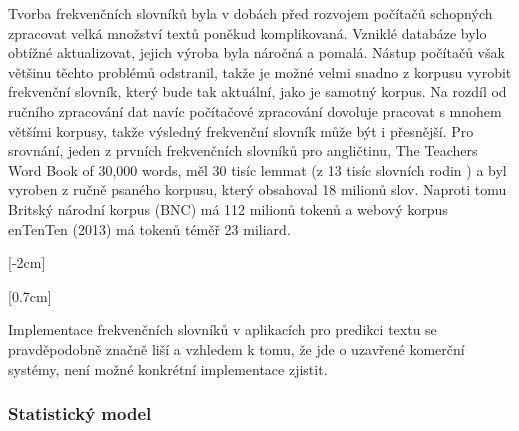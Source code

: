 \documentclass{article}
\begin{document}
Tvorba frekvenčních slovníků byla v dobách před rozvojem počítačů schopných zpracovat velká množství textů poněkud komplikovaná. Vzniklé databáze bylo obtížné aktualizovat, jejich výroba byla náročná a pomalá. Nástup počítačů však většinu těchto problémů odstranil, takže je možné velmi snadno z korpusu vyrobit frekvenční slovník, který bude tak aktuální, jako je samotný korpus. Na rozdíl od ručního zpracování dat navíc počítačové zpracování dovoluje pracovat s mnohem většími korpusy, takže výsledný frekvenční slovník může být i přesnější. Pro srovnání, jeden z prvních frekvenčních slovníků pro angličtinu, The Teachers Word Book of 30,000 words, měl 30 tisíc lemmat (z 13 tisíc slovních rodin %
) a byl vyroben z ručně psaného korpusu, který obsahoval 18 milionů slov. %
Naproti tomu Britský národní korpus (BNC) má 112 milionů tokenů a webový korpus enTenTen (2013) má tokenů téměř 23 miliard. %

[-2cm]

[0.7cm]

Implementace frekvenčních slovníků v aplikacích pro predikci textu se pravděpodobně značně liší a vzhledem k tomu, že jde o uzavřené komerční systémy, není možné konkrétní implementace zjistit.

\subsubsection{Statistický model}



\end{document}
